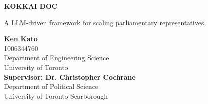 \begin{titlepage}
    \begin{center}
        \vspace*{1cm}
            
        \Huge
        \textbf{KOKKAI DOC}
            
        \vspace{0.5cm}
        \LARGE
        A LLM-driven framework for scaling parliamentary representatives
            
        \vspace{1.5cm}
            
        \textbf{Ken Kato}\\
        \Large
        1006344760\\
        Department of Engineering Science\\
        University of Toronto\\
        \vspace{1.5cm}
        \LARGE
        \textbf{Supervisor: Dr. Christopher Cochrane}\\
        \Large
        Department of Political Science\\
        University of Toronto Scarborough\\        
            
    \end{center}
\end{titlepage}
